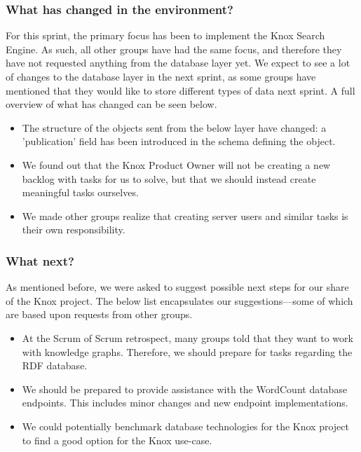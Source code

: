 \subsubsection{What has changed in the environment?}
For this sprint, the primary focus has been to implement the Knox Search Engine. As such, all other groups have had the same focus, and therefore they have not requested anything from the database layer yet. 
We expect to see a lot of changes to the database layer in the next sprint, as some groups have mentioned that they would like to store different types of data next sprint.
A full overview of what has changed can be seen below.

\begin{itemize}
    \item The structure of the objects sent from the below layer have changed: a 'publication' field has been introduced in the schema defining the object.
    \item We found out that the Knox Product Owner will not be creating a new backlog with tasks for us to solve, but that we should instead create meaningful tasks ourselves.
    \item We made other groups realize that creating server users and similar tasks is their own responsibility.
\end{itemize}

\subsubsection{What next?}
As mentioned before, we were asked to suggest possible next steps for our share of the Knox project. The below list encapsulates our suggestions---some of which are based upon requests from other groups.

\begin{itemize}
    \item At the Scrum of Scrum retrospect, many groups told that they want to work with knowledge graphs. Therefore, we should prepare for tasks regarding the RDF database.
    \item We should be prepared to provide assistance with the WordCount database endpoints. This includes minor changes and new endpoint implementations.
    \item We could potentially benchmark database technologies for the Knox project to find a good option for the Knox use-case.
\end{itemize}